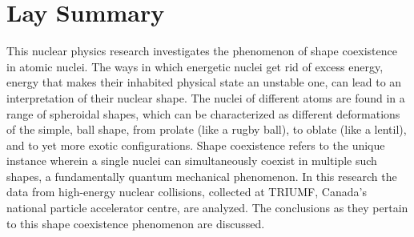 

\chapter{Lay Summary}

This nuclear physics research investigates the phenomenon of shape coexistence in atomic nuclei. The ways in which energetic nuclei get rid of excess energy, energy that makes their inhabited physical state an unstable one, can lead to an interpretation of their nuclear shape. The nuclei of different atoms are found in a range of spheroidal shapes, which can be characterized as different deformations of the simple, ball shape, from prolate (like a rugby ball), to oblate (like a lentil), and to yet more exotic configurations. Shape coexistence refers to the unique instance wherein a single nuclei can simultaneously coexist in multiple such shapes, a fundamentally quantum mechanical phenomenon. In this research the data from high-energy nuclear collisions, collected at TRIUMF, Canada's national particle accelerator centre, are analyzed. The conclusions as they pertain to this shape coexistence phenomenon are discussed. \newline

